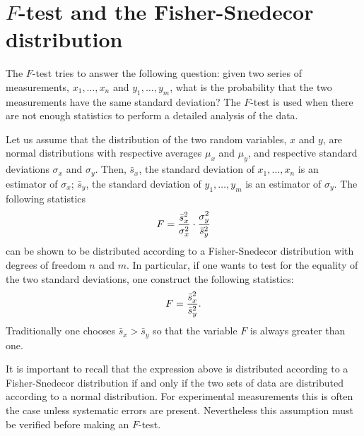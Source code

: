 \documentclass[twoside]{book}
\begin{document}
\section{$F$-test and the Fisher-Snedecor distribution}
\label{sec:Ftest} The $F$-test tries to answer the following
question: given two series of measurements, $x_1,\ldots,x_n$ and
$y_1,\ldots,y_m$, what is the probability that the two
measurements have the same standard deviation? The $F$-test is
used when there are not enough statistics to perform a detailed
analysis of the data.

Let us assume that the distribution of the two random variables,
$x$ and $y$, are normal distributions with respective averages
$\mu_x$ and $\mu_y$, and respective standard deviations $\sigma_x$
and $\sigma_y$. Then, $\bar{s}_x$, the standard deviation of
$x_1,\ldots,x_n$ is an estimator of $\sigma_x$; $\bar{s}_y$, the
standard deviation of $y_1,\ldots,y_m$ is an estimator of
$\sigma_y$. The following statistics
\begin{equation}
  F={\displaystyle \bar{s}_x^2\over\sigma_x^2}\cdot{\displaystyle\sigma_y^2\over\bar{s}_y^2}
\end{equation}
can be shown to be distributed according to a Fisher-Snedecor
distribution with degrees of freedom $n$ and $m$. In particular,
if one wants to test for the equality of the two standard
deviations, one construct the following statistics:
\begin{equation}
\label{eq:Ftest}
  F={\displaystyle \bar{s}_x^2\over\bar{s}_y^2}.
\end{equation}
Traditionally one chooses $\bar{s}_x>\bar{s}_y$ so that the
variable $F$ is always greater than one.

It is important to recall that the expression above is distributed
according to a Fisher-Snedecor distribution if and only if the two
sets of data are distributed according to a normal distribution.
For experimental measurements this is often the case unless
systematic errors are present. Nevertheless this assumption must
be verified before making an $F$-test.
\end{document}
